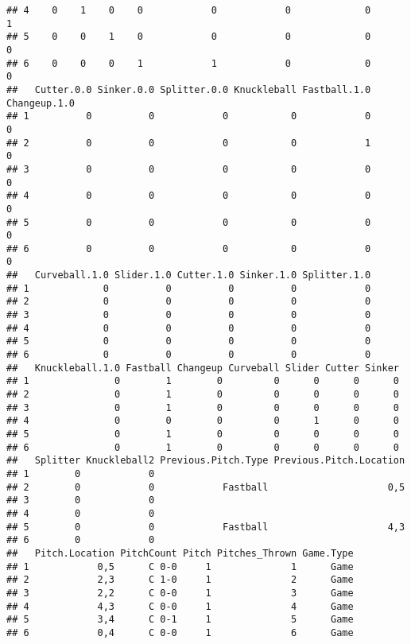 \documentclass[]{article}
\begin{document}
\begin{verbatim}
## 4    0    1    0    0            0            0             0          1
## 5    0    0    1    0            0            0             0          0
## 6    0    0    0    1            1            0             0          0
##   Cutter.0.0 Sinker.0.0 Splitter.0.0 Knuckleball Fastball.1.0 Changeup.1.0
## 1          0          0            0           0            0            0
## 2          0          0            0           0            1            0
## 3          0          0            0           0            0            0
## 4          0          0            0           0            0            0
## 5          0          0            0           0            0            0
## 6          0          0            0           0            0            0
##   Curveball.1.0 Slider.1.0 Cutter.1.0 Sinker.1.0 Splitter.1.0
## 1             0          0          0          0            0
## 2             0          0          0          0            0
## 3             0          0          0          0            0
## 4             0          0          0          0            0
## 5             0          0          0          0            0
## 6             0          0          0          0            0
##   Knuckleball.1.0 Fastball Changeup Curveball Slider Cutter Sinker
## 1               0        1        0         0      0      0      0
## 2               0        1        0         0      0      0      0
## 3               0        1        0         0      0      0      0
## 4               0        0        0         0      1      0      0
## 5               0        1        0         0      0      0      0
## 6               0        1        0         0      0      0      0
##   Splitter Knuckleball2 Previous.Pitch.Type Previous.Pitch.Location
## 1        0            0                                            
## 2        0            0            Fastball                     0,5
## 3        0            0                                            
## 4        0            0                                            
## 5        0            0            Fastball                     4,3
## 6        0            0                                            
##   Pitch.Location PitchCount Pitch Pitches_Thrown Game.Type
## 1            0,5      C 0-0     1              1      Game
## 2            2,3      C 1-0     1              2      Game
## 3            2,2      C 0-0     1              3      Game
## 4            4,3      C 0-0     1              4      Game
## 5            3,4      C 0-1     1              5      Game
## 6            0,4      C 0-0     1              6      Game
\end{verbatim}
\end{document}
